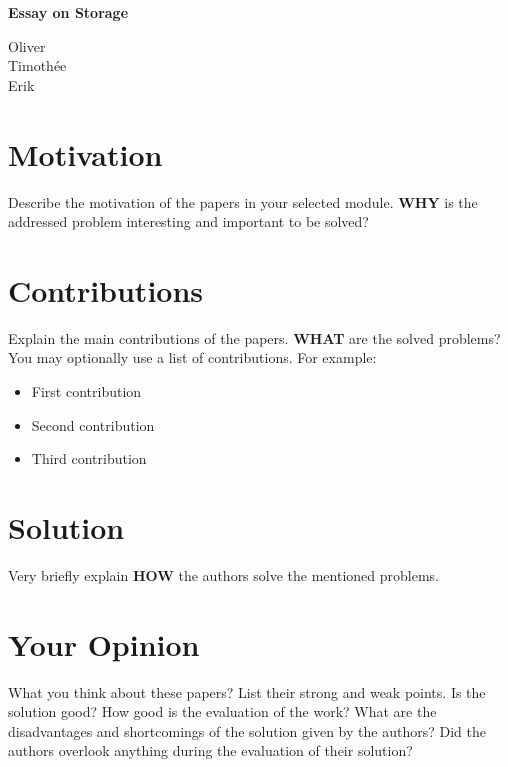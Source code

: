 \documentclass[10pt,a4paper]{article}
\title{}
\date{}
\author{}
\begin{document}
\thispagestyle{fancy}

\begin{center}
    {\Large\textbf{Essay on Storage}}\\
    \vspace{1em}

    {\large Oliver }\\
    {\large Timothée } \\
    {\large Erik }


\end{center}\bigskip

\section{Motivation}
Describe the motivation of the papers in your selected module. \textbf{WHY} is the addressed problem interesting and important to be solved?

\section{Contributions}
Explain the main contributions of the papers. \textbf{WHAT} are the solved problems?
You may optionally use a list of contributions. For example:
\begin{itemize}
 \item First contribution
 \item Second contribution
 \item Third contribution
\end{itemize}

\section{Solution}
Very briefly explain \textbf{HOW} the authors solve the mentioned problems.

\section{Your Opinion}
What you think about these papers? List their strong and weak points. Is the solution good? How good is the evaluation of the work? What are the disadvantages and shortcomings of the solution given by the authors? Did the authors overlook anything during the evaluation of their solution?
\end{document}
